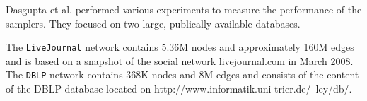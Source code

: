 Dasgupta et al. \cite{dasgupta2012social} performed various experiments to measure the performance of the samplers.
They focused on two large, publically available databases.

The \texttt{LiveJournal} network contains 5.36M nodes and approximately 160M edges and is based on a snapshot of the social network livejournal.com in March 2008.
The \texttt{DBLP} network contains 368K nodes and 8M edges and consists of the content of the DBLP database located on http://www.informatik.uni-trier.de/~ley/db/.
